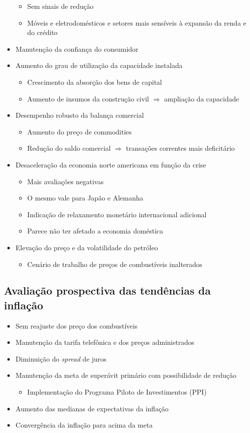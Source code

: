 \documentclass[11pt]{article}
\begin{document}
\begin{itemize}
\begin{itemize}
\item Sem sinais de redução
\item Móveis e eletrodomésticos e setores mais sensíveis à expansão da renda e do crédito
\end{itemize}
\item Manutenção da confiança do consumidor
\item Aumento do grau de utilização da capacidade instalada
\begin{itemize}
\item Crescimento da absorção dos bens de capital
\item Aumento de insumos da construção civil \(\Rightarrow\) ampliação da capacidade
\end{itemize}
\item Desempenho robusto da balança comercial
\begin{itemize}
\item Aumento do preço de commodities
\item Redução do saldo comercial \(\Rightarrow\) transações correntes mais deficitário
\end{itemize}
\item Desaceleração da economia norte americana em função da crise
\begin{itemize}
\item Mais avaliações negativas
\item O mesmo vale para Japão e Alemanha
\item Indicação de relaxamento monetário internacional adicional
\item Parece não ter afetado a economia doméstica
\end{itemize}
\item Elevação do preço e da volatilidade do petróleo
\begin{itemize}
\item Cenário de trabalho de preços de combustíveis inalterados
\end{itemize}
\end{itemize}
\subsection*{Avaliação prospectiva das tendências da inflação}
\label{sec:org40eed6e}
\begin{itemize}
\item Sem reajuste dos preço dos combustíveis
\item Manutenção da tarifa telefônica e dos preços administrados
\item Diminuição do \emph{spread} de juros
\item Manutenção da meta de superávit primário com possibilidade de redução
\begin{itemize}
\item Implementação do Programa Piloto de Investimentos (PPI)
\end{itemize}
\item Aumento das medianas de expectativas da inflação
\item Convergência da inflação para acima da meta
\end{itemize}
\end{document}
